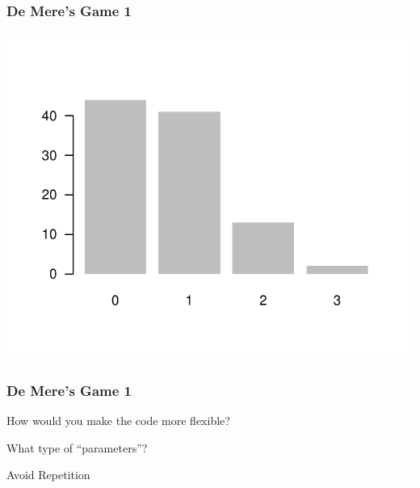 \documentclass[12pt]{beamer}\usepackage[]{graphicx}\usepackage[]{color}
\newenvironment{knitrout}{}{} %
\begin{document}

\begin{frame}[fragile]
\frametitle{De Mere's Game 1}

\begin{knitrout}\footnotesize
{}\color{fgcolor}

{\centering \includegraphics[width=.7\linewidth,height=.6\linewidth]{figure/unnamed-chunk-54-1} 

}



\end{knitrout}

\end{frame}


\begin{frame}[fragile]
\frametitle{De Mere's Game 1}

\bbi
  \item How would you make the code more flexible?
  \item What type of ``parameters''?
  \item Avoid Repetition
\ei
\eb

\end{frame}

\end{document}
